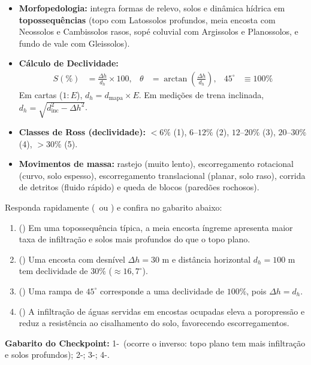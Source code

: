 \begin{boxResumo}
\begin{itemize}[leftmargin=1.4em, itemsep=2.5pt]
  \item \textbf{Morfopedologia:} integra formas de relevo, solos e dinâmica hídrica em \textbf{topossequências} (topo com Latossolos profundos, meia encosta com Neossolos e Cambissolos rasos, sopé coluvial com Argissolos e Planossolos, e fundo de vale com Gleissolos).
  \item \textbf{Cálculo de Declividade:}
  \begin{align*}
    S(\%) &= \frac{\Delta h}{d_h} \times 100, & \theta &= \arctan\!\left(\frac{\Delta h}{d_h}\right), & 45^\circ &\equiv 100\%
  \end{align*}
  Em cartas ($1{:}E$), $d_h = d_{\text{mapa}} \times E$. Em medições de trena inclinada, $d_h = \sqrt{d_{\text{inc}}^2 - \Delta h^2}$.
  \item \textbf{Classes de Ross (declividade):} $<6\%$ (1), $6\text{--}12\%$ (2), $12\text{--}20\%$ (3), $20\text{--}30\%$ (4), $>30\%$ (5).
  \item \textbf{Movimentos de massa:} rastejo (muito lento), escorregamento rotacional (curvo, solo espesso), escorregamento translacional (planar, solo raso), corrida de detritos (fluido rápido) e queda de blocos (paredões rochosos).
\end{itemize}
\end{boxResumo}

\begin{boxTeste}
Responda rapidamente (\V\ ou \F) e confira no gabarito abaixo:
\begin{enumerate}[leftmargin=1.6em, itemsep=2.5pt]
  \item (\quad) Em uma topossequência típica, a meia encosta íngreme apresenta maior taxa de infiltração e solos mais profundos do que o topo plano.
  \item (\quad) Uma encosta com desnível $\Delta h = 30\text{ m}$ e distância horizontal $d_h = 100\text{ m}$ tem declividade de $30\%$ ($\approx 16{,}7^\circ$).
  \item (\quad) Uma rampa de $45^\circ$ corresponde a uma declividade de $100\%$, pois $\Delta h = d_h$.
  \item (\quad) A infiltração de águas servidas em encostas ocupadas eleva a poropressão e reduz a resistência ao cisalhamento do solo, favorecendo escorregamentos.
\end{enumerate}
\vspace{4pt}
{\footnotesize\textbf{Gabarito do Checkpoint:} 1-\F\ (ocorre o inverso: topo plano tem mais infiltração e solos profundos); 2-\V; 3-\V; 4-\V.}
\end{boxTeste}
